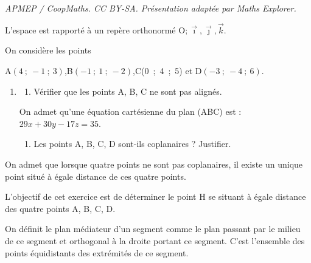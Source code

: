 \documentclass[10pt]{article}
\providecommand{\Oijk}{\(\mathrm{O};\vec{\imath},\vec{\jmath},\vec{k}\)}
\begin{document}
\noindent\textit{APMEP / CoopMaths. CC BY-SA. Présentation adaptée par Maths Explorer.}\par\medskip
\medskip

L'espace est rapporté à un repère orthonormé \Oijk.

On considère les points 

\begin{center}A$(4~;~-1~;~3)$,\quad B$(-1~;~1~;~-2)$,\quad C(0~;~4~;~5) et D$(-3~;~-4~;~6)$.\end{center}

\begin{enumerate}
\item
	\begin{enumerate}
		\item Vérifier que les points A, B, C ne sont pas alignés.
	\end{enumerate}

On admet qu’une équation cartésienne du plan (ABC) est : $29x + 30y - 17z = 35$.

	\begin{enumerate}[resume]
		\item Les points A, B, C, D sont-ils coplanaires ? Justifier.
	\end{enumerate}
\end{enumerate}

On admet que lorsque quatre points ne sont pas coplanaires, il existe un unique point situé à égale distance de ces quatre points.

L’objectif de cet exercice est de déterminer le point H se situant à égale distance des quatre points A, B, C, D.

On définit le plan médiateur d’un segment comme le plan passant par le milieu de ce segment et orthogonal à la droite portant ce segment. C’est l’ensemble des points équidistants des extrémités de ce segment.
\end{document}
